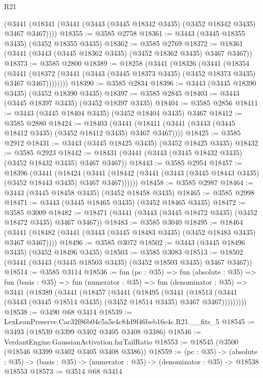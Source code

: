 \begin{lexlean}{R21}
\begin{coremodule}
    (@3441 (@18341 (@3441 (@3443 (@3445 @18342 @3435) (@3452 @18342 @3435) @3467 @3467))))
@18355 := @3585 @2758
@18361 := @3443 (@3445 @18355 @3435) (@3452 @18355 @3435)
@18362 := @3585 @2769
@18372 := @18361 (@3441 (@3443 (@3445 @18362 @3435) (@3452 @18362 @3435) @3467 @3467))
@18373 := @3585 @2800
@18389 := @18258
    (@3441
      (@18326
        (@3441
          (@18354
            (@3441
              (@18372 (@3441 (@3443 (@3445 @18373 @3435) (@3452 @18373 @3435) @3467 @3467))))))))
@18390 := @3585 @2834
@18396 := @3443 (@3445 @18390 @3435) (@3452 @18390 @3435)
@18397 := @3585 @2845
@18403 := @3443 (@3445 @18397 @3435) (@3452 @18397 @3435)
@18404 := @3585 @2856
@18411 := @3443 (@3445 @18404 @3435) (@3452 @18404 @3435) @3467
@18412 := @3585 @2880
@18424 := @18403
    (@3441 (@18411 (@3441 (@3443 (@3445 @18412 @3435) (@3452 @18412 @3435) @3467 @3467))))
@18425 := @3585 @2912
@18431 := @3443 (@3445 @18425 @3435) (@3452 @18425 @3435)
@18432 := @3585 @2923
@18442 := @18431 (@3441 (@3443 (@3445 @18432 @3435) (@3452 @18432 @3435) @3467 @3467))
@18443 := @3585 @2954
@18457 := @18396
    (@3441
      (@18424
        (@3441 (@18442 (@3441 (@3443 (@3445 @18443 @3435) (@3452 @18443 @3435) @3467 @3467))))))
@18458 := @3585 @2987
@18464 := @3443 (@3445 @18458 @3435) (@3452 @18458 @3435)
@18465 := @3585 @2998
@18471 := @3443 (@3445 @18465 @3435) (@3452 @18465 @3435)
@18472 := @3585 @3009
@18482 := @18471 (@3441 (@3443 (@3445 @18472 @3435) (@3452 @18472 @3435) @3467 @3467))
@18483 := @3585 @3040
@18495 := @18464
    (@3441 (@18482 (@3441 (@3443 (@3445 @18483 @3435) (@3452 @18483 @3435) @3467 @3467))))
@18496 := @3585 @3072
@18502 := @3443 (@3445 @18496 @3435) (@3452 @18496 @3435)
@18503 := @3585 @3083
@18513 := @18502 (@3441 (@3443 (@3445 @18503 @3435) (@3452 @18503 @3435) @3467 @3467))
@18514 := @3585 @3114
@18536 := fun (pc : @35) =>
  fun (absolute : @35) =>
  fun (basis : @35) =>
  fun (numerator : @35) =>
  fun (denominator : @35) =>
  @3441
    (@18389
      (@3441
        (@18457
          (@3441
            (@18495
              (@3441
                (@18513 (@3441 (@3443 (@3445 @18514 @3435) (@3452 @18514 @3435) @3467 @3467)))))))))
@18538 := @3490 @68 @3414
@18539 := LexLeanPreserve.Cac32f86b04c5a5e4c84d9f46beb16e4c.R21.__fits_5
@18545 := @3493 (@18539 @3399 @3402 @3405 @3408 @3386)
@18546 := VerdantEngine.GaussianActivation.farTailRatio
@18553 := @18545 (@3500 (@18546 @3399 @3402 @3405 @3408 @3386))
@18559 := (pc : @35) ->
  (absolute : @35) -> (basis : @35) -> (numerator : @35) -> (denominator : @35) -> @18538 @18553
@18573 := @3514
    @68
    @3414

\end{coremodule}
\end{lexlean}

